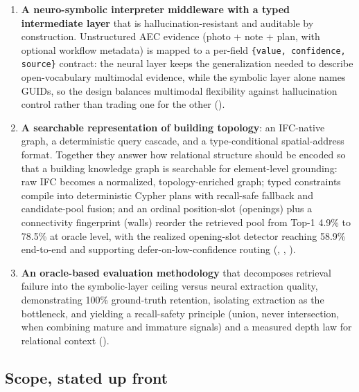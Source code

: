 \begin{enumerate}
  \item \textbf{A neuro-symbolic interpreter middleware with a typed intermediate layer} that is
  hallucination-resistant and auditable by construction. Unstructured AEC evidence (photo + note +
  plan, with optional workflow metadata) is mapped to a per-field \texttt{\{value, confidence,
  source\}} contract: the neural layer keeps the generalization needed to describe open-vocabulary
  multimodal evidence, while the symbolic layer alone names GUIDs, so the design balances multimodal
  flexibility against hallucination control rather than trading one for the other ().

  \item \textbf{A searchable representation of building topology}: an IFC-native graph, a deterministic
  query cascade, and a type-conditional spatial-address format. Together they answer how relational
  structure should be encoded so that a building knowledge graph is searchable for element-level
  grounding: raw IFC becomes a normalized, topology-enriched graph; typed constraints compile into
  deterministic Cypher plans with recall-safe fallback and candidate-pool fusion; and an ordinal
  position-slot (openings) plus a connectivity fingerprint (walls) reorder the retrieved pool from
  Top-1 4.9\% to 78.5\% at oracle level, with the realized opening-slot detector reaching 58.9\%
  end-to-end and supporting defer-on-low-confidence routing (, ,
  ).

  \item \textbf{An oracle-based evaluation methodology} that decomposes retrieval failure into the
  symbolic-layer ceiling versus neural extraction quality, demonstrating 100\% ground-truth
  retention, isolating extraction as the bottleneck, and yielding a recall-safety principle (union,
  never intersection, when combining mature and immature signals) and a measured depth law for
  relational context ().
\end{enumerate}

\subsection{Scope, stated up front}

